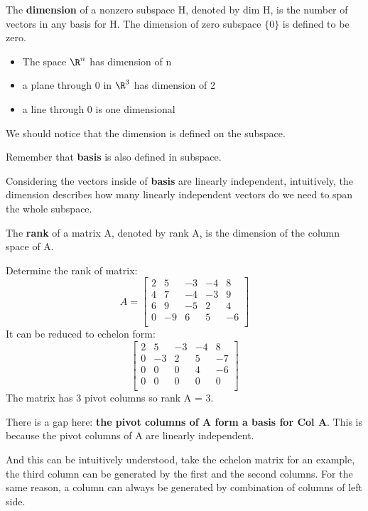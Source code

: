 \begin{definition}
    The \textbf{dimension} of a nonzero subspace H, denoted by dim H, is the number of vectors in any basis for H. The dimension of zero subspace \(\{ 0 \} \) is defined to be zero.
\end{definition}

\begin{itemize}
    \item The space \(\R^n\) has dimension of n 
    \item a plane through 0 in \(\R^3\) has dimension of 2 
    \item a line through 0 is one dimensional
\end{itemize}

\begin{remark}
    We should notice that the dimension is defined on the subspace.  

    Remember that \textbf{basis} is also defined in subspace. 

    Considering the vectors inside of \textbf{basis} are linearly independent, intuitively, the dimension describes how many linearly independent vectors do we need to span the whole subspace.
\end{remark}

\begin{definition}
    The \textbf{rank} of a matrix A, denoted by rank A, is the dimension of the column space of A.
\end{definition}

\begin{eg}
    Determine the rank of matrix:
    \[
        A = \begin{bmatrix}
            2 & 5 & -3 & -4 &  8 \\
            4 & 7 & -4 & -3 &  9 \\
            6 & 9 & -5 & 2 &  4 \\
            0 & -9 & 6 & 5 &  -6 \\
        \end{bmatrix}
    \]
    It can be reduced to echelon form:
    \[
        \begin{bmatrix}
            2 & 5 & -3 & -4 &  8 \\
            0 & -3 & 2 & 5 &  -7 \\
            0 & 0 & 0 & 4 &  -6 \\
            0 & 0 & 0 & 0 &  0 \\
        \end{bmatrix}
    \]
    The matrix has 3 pivot columns so rank A = 3.

    There is a gap here: \textbf{the pivot columns of A form a basis for Col A}.  This is because the pivot columns of A are linearly independent. 

    And this can be intuitively understood, take the echelon matrix for an example, the third column can be generated by the first and the second columns. For the same reason, a column can always be generated by combination of columns of left side. 
\end{eg}


